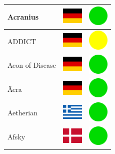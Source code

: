 \documentclass[12pt, a4paper, twoside]{report}
\begin{document}
\begin{center}
\begin{longtable}{|p{5cm}|p{2cm}|p{2cm}|}
 Acranius                                                   & \includegraphics[width=1cm]{../4x3/de} &   \includegraphics[width=1cm]{../likes/y} \\ \hline
 ADDICT                                                     & \includegraphics[width=1cm]{../4x3/de} &   \includegraphics[width=1cm]{../likes/m} \\ \hline
 Aeon of Disease                                            & \includegraphics[width=1cm]{../4x3/de} &   \includegraphics[width=1cm]{../likes/y} \\ \hline
 Äera                                                       & \includegraphics[width=1cm]{../4x3/de} &   \includegraphics[width=1cm]{../likes/y} \\ \hline
 Aetherian                                                  & \includegraphics[width=1cm]{../4x3/gr} &   \includegraphics[width=1cm]{../likes/y} \\ \hline
 Afsky                                                      & \includegraphics[width=1cm]{../4x3/dk} &   \includegraphics[width=1cm]{../likes/y} \\ \hline

\end{longtable}
\end{center}
\end{document}
